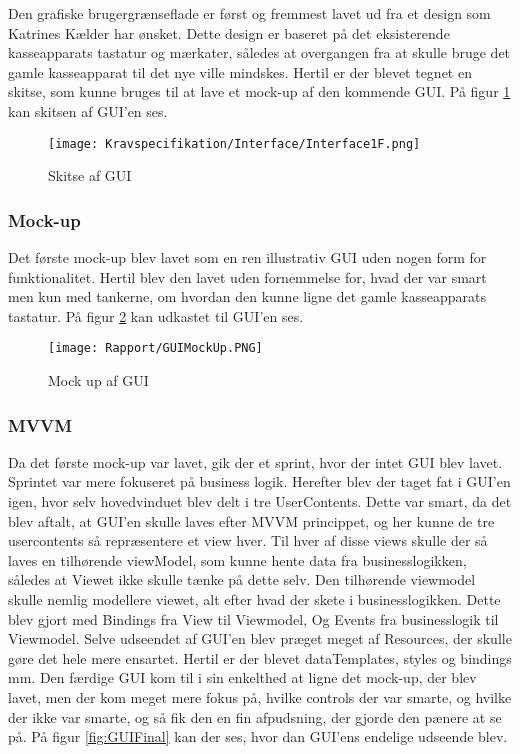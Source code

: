 Den grafiske brugergrænseflade er først og fremmest lavet ud fra et design som Katrines Kælder
har ønsket. Dette design er baseret på det eksisterende kasseapparats tastatur og mærkater, således
at overgangen fra at skulle bruge det gamle kasseapparat til det nye ville mindskes.
Hertil er der blevet tegnet en skitse, som kunne bruges til at lave et mock-up af den kommende GUI. På figur \ref{fig:GUTskitse} kan skitsen af GUI'en ses.\newline

\begin{figure}[H]
\centering
	\texttt{[image: Kravspecifikation/Interface/Interface1F.png]}
	\caption{Skitse af GUI}
	\label{fig:GUTskitse}
\end{figure}

\subsubsection{Mock-up}
Det første mock-up blev lavet som en ren illustrativ GUI uden nogen form for funktionalitet. Hertil
blev den lavet uden fornemmelse for, hvad der var smart men kun med tankerne, om hvordan den
kunne ligne det gamle kasseapparats tastatur. På figur \ref{fig:GUIMock} kan udkastet til GUI'en ses.
\begin{figure}[H]
\centering
	\texttt{[image: Rapport/GUIMockUp.PNG]}
	\caption{Mock up af GUI}
	\label{fig:GUIMock}
\end{figure}
\subsubsection{MVVM}
Da det første mock-up var lavet, gik der et sprint, hvor der intet GUI blev lavet. Sprintet var mere fokuseret på business logik. Herefter blev der taget fat i GUI’en igen, hvor selv hovedvinduet blev delt i tre
UserContents. Dette var smart, da det blev aftalt, at GUI’en skulle laves efter MVVM princippet,
og her kunne de tre usercontents så repræsentere et view hver. Til hver af disse views skulle der så
laves en tilhørende viewModel, som kunne hente data fra businesslogikken, således at Viewet ikke
skulle tænke på dette selv. Den tilhørende viewmodel skulle nemlig modellere viewet, alt efter hvad
der skete i businesslogikken. Dette blev gjort med Bindings fra View til Viewmodel, Og Events fra
businesslogik til Viewmodel.
Selve udseendet af GUI’en blev præget meget af Resources, der skulle gøre det hele mere ensartet.
Hertil er der blevet dataTemplates, styles og bindings mm.
Den færdige GUI kom til i sin enkelthed at ligne det mock-up, der blev lavet, men der kom meget
mere fokus på, hvilke controls der var smarte, og hvilke der ikke var smarte, og så fik den en fin
afpudsning, der gjorde den pænere at se på. På figur \ref{fig:GUIFinal} kan der ses, hvor dan GUI'ens endelige udseende blev.

